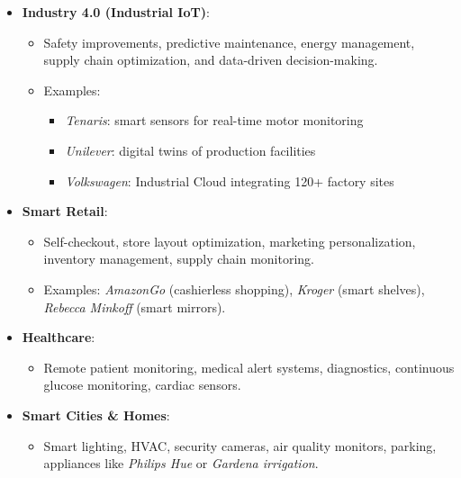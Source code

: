 \begin{itemize}
    \item \textbf{Industry 4.0 (Industrial IoT)}:
    
    \begin{itemize}
        \item Safety improvements, predictive maintenance, energy management, supply chain optimization, and data-driven decision-making.
        
        \item Examples:
        
        \begin{itemize}
            \item \textit{Tenaris}: smart sensors for real-time motor monitoring
            
            \item \textit{Unilever}: digital twins of production facilities
            
            \item \textit{Volkswagen}: Industrial Cloud integrating 120+ factory sites
        \end{itemize}
    \end{itemize}
    
    \item \textbf{Smart Retail}:
    
    \begin{itemize}
        \item Self-checkout, store layout optimization, marketing personalization, inventory management, supply chain monitoring.
        
        \item Examples: \textit{AmazonGo} (cashierless shopping), \textit{Kroger} (smart shelves), \textit{Rebecca Minkoff} (smart mirrors).
    \end{itemize}
    
    \item \textbf{Healthcare}:
    
    \begin{itemize}
        \item Remote patient monitoring, medical alert systems, diagnostics, continuous glucose monitoring, cardiac sensors.
    \end{itemize}
    
    \item \textbf{Smart Cities \& Homes}:
    
    \begin{itemize}
        \item Smart lighting, HVAC, security cameras, air quality monitors, parking, appliances like \textit{Philips Hue} or \textit{Gardena irrigation}.
    \end{itemize}
    

\end{itemize}
